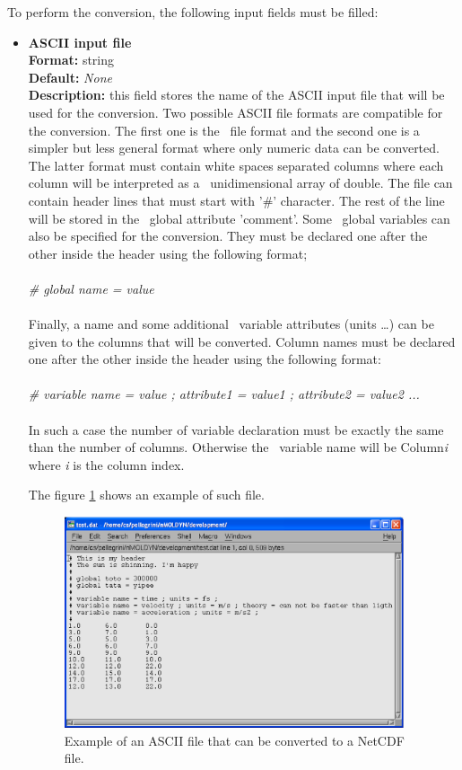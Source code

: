 \documentclass[a4paper,11pt]{report}
\begin{document}
To perform the conversion, the following input fields must be filled:
\begin{itemize}
\item \textbf{ASCII input file}\\
\textbf{Format:} string\\
\textbf{Default:} \textit{None}\\
\textbf{Description:} this field stores the name of the ASCII input file that will be used for the conversion. Two possible 
ASCII file formats are compatible for the conversion. The first one is the \CDL\ file format \cite{CDL} and the second one is 
a simpler but less general format where only numeric data can be converted. The latter format must contain white spaces separated columns where 
each column will be interpreted as a \NetCDF\ unidimensional array of double. The file can contain header lines that must 
start with '\#' character. The rest of the line will be stored in the \NetCDF\ global attribute 'comment'. 
Some \NetCDF\ global variables can also be specified for the conversion. They must be declared one after the other inside 
the header using the following format;
\\\\
\textit{\# global name = value}
\\\\
Finally, a name and some additional \NetCDF\ variable attributes (units \ldots ) can be given to the columns that will 
be converted. Column names must be declared one after the other inside the header using the following format:
\\\\
\textit{\# variable name = value ; attribute1 = value1 ; attribute2 = value2 ...}
\\\\
In such a case the number of variable declaration must be exactly the same than the number of columns. Otherwise the 
\NetCDF\ variable name will be Column\textit{i} where \textit{i} is the column index.

The figure \ref{fig:convert_ascii_netcdf_example} shows an example of such file.
\newpage
\begin{figure}[h!]
\begin{center}
\includegraphics[width=10cm]{Figures/convert_ascii_netcdf_example.eps}
\end{center}
\caption[Example of an ASCII file that can be converted to a NetCDF file]{Example of an ASCII file that can be converted to a NetCDF file.}
\label{fig:convert_ascii_netcdf_example}
\end{figure}   


\end{itemize}
\end{document}
